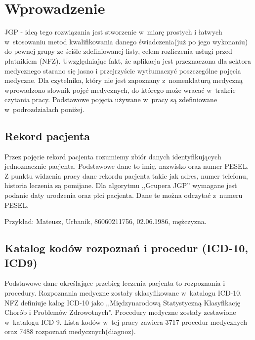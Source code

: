 \chapter{Wprowadzenie}
\label{cha:wprowadzenie}

JGP - ideą tego rozwiązania jest stworzenie w~miarę prostych i łatwych w~stosowaniu metod kwalifikowania danego świadczenia(już po jego wykonaniu) do pewnej grupy ze ściśle zdefiniowanej listy, celem rozliczenia usługi przed płatnikiem (NFZ).
Uwzględniając fakt, że aplikacja jest przeznaczona dla sektora medycznego starano się jasno i przejrzyście wytłumaczyć poszczególne pojęcia medyczne. Dla czytelnika, który nie jest zapoznany z~nomenklaturą medyczną wprowadzono słownik pojęć medycznych, do którego może wracać w~trakcie czytania pracy. Podstawowe pojęcia używane w~pracy są zdefiniowane w~podrozdziałach poniżej.  


\section{Rekord pacjenta}
\label{sec:rekordPacjenta}

Przez pojęcie rekord pacjenta rozumiemy zbiór danych identyfikujących jednoznacznie pacjenta. Podstawowe dane to imię, nazwisko oraz numer PESEL. Z punktu widzenia pracy dane rekordu pacjenta takie jak adres, numer telefonu, historia leczenia są pomijane. Dla algorytmu ,,Grupera JGP'' wymagane jest podanie daty urodzenia oraz płci pacjenta. Dane te można odczytać z~numeru PESEL.

Przykład:
Mateusz, Urbanik, 86060211756, 02.06.1986, mężczyzna.


\section{Katalog kodów rozpoznań i procedur (ICD-10, ICD9)}
\label{sec:kodyICD}

Podstawowe dane określające przebieg leczenia pacjenta to rozpoznania i procedury. Rozpoznania medyczne zostały sklasyfikowane w~katalogu ICD-10. NFZ definiuje kalog ICD-10 jako ,,Międzynarodową Statystyczną Klasyfikację Chorób i Problemów Zdrowotnych''.
Procedury medyczne zostały zestawione w~katalogu ICD-9. Lista kodów w~tej pracy zawiera 3717 procedur medycznych oraz 7488 rozpoznań medycznych(diagnoz).

